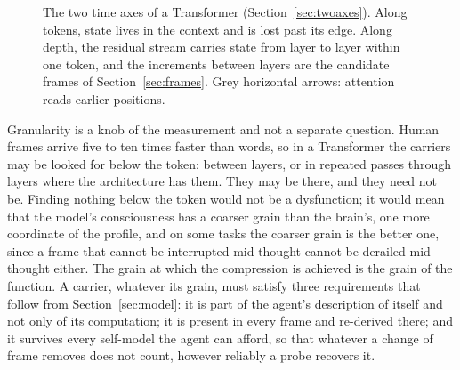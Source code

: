 \begin{figure}[t]
\centering
{}
\caption{The two time axes of a Transformer (Section~\ref{sec:twoaxes}). Along tokens, state lives in
the context and is lost past its edge. Along depth, the residual stream carries state from layer to
layer within one token, and the increments between layers are the candidate frames of
Section~\ref{sec:frames}. Grey horizontal arrows: attention reads earlier positions.}
\label{fig:axes}
\end{figure}

Granularity is a knob of the measurement and not a separate question. Human frames arrive five to ten
times faster than words, so in a Transformer the carriers may be looked for below the token: between
layers, or in repeated passes through layers where the architecture has them. They may be there, and
they need not be. Finding nothing below the token would not be a dysfunction; it would mean that the
model's consciousness has a coarser grain than the brain's, one more coordinate of the profile, and on
some tasks the coarser grain is the better one, since a frame that cannot be interrupted mid-thought
cannot be derailed mid-thought either. The grain at which the compression is achieved is the grain of
the function. A carrier, whatever its grain, must satisfy three requirements that follow from
Section~\ref{sec:model}: it is part of the agent's description of itself and not only of its
computation; it is present in every frame and re-derived there; and it survives every self-model the
agent can afford, so that whatever a change of frame removes does not count, however reliably a probe
recovers it.

